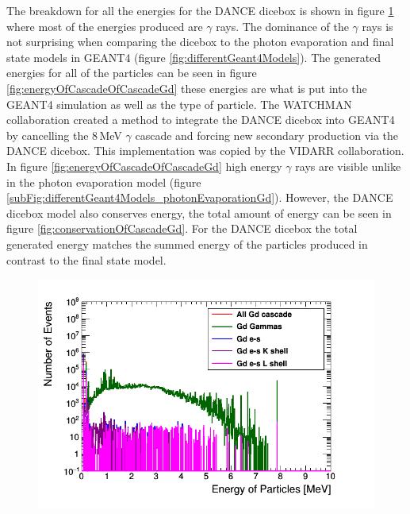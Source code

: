The breakdown for all the energies for the DANCE dicebox is shown in figure \ref{fig:gadoliniumEnergiesCascade} where most of the energies produced are $\gamma$ rays. The dominance of the $\gamma$ rays is not surprising when comparing the dicebox to the photon evaporation and final state models in GEANT4 (figure \ref{fig:differentGeant4Models}). The generated energies for all of the particles can be seen in figure \ref{fig:energyOfCascadeOfCascadeGd} these energies are what is put into the GEANT4 simulation as well as the type of particle. The WATCHMAN collaboration created a method to integrate the DANCE dicebox into GEANT4 by cancelling the 8\,MeV $\gamma$ cascade and forcing new secondary production via the DANCE dicebox. This implementation was copied by the VIDARR collaboration. In figure \ref{fig:energyOfCascadeOfCascadeGd} high energy $\gamma$ rays are visible unlike in the photon evaporation model (figure \ref{subFig:differentGeant4Models_photonEvaporationGd}). However, the DANCE dicebox model also conserves energy, the total amount of energy can be seen in figure  \ref{fig:conservationOfCascadeGd}. For the DANCE dicebox the total generated energy matches the summed energy of the particles produced in contrast to the final state model. 

\begin{figure}[htbp]
 \centering
 \includegraphics[width=0.7\linewidth]{Chapter4/Figs/Raster/gadolinium/gadoliniumEnergiesCascade.png}
 \label{fig:gadoliniumEnergiesCascade}
\end{figure}


